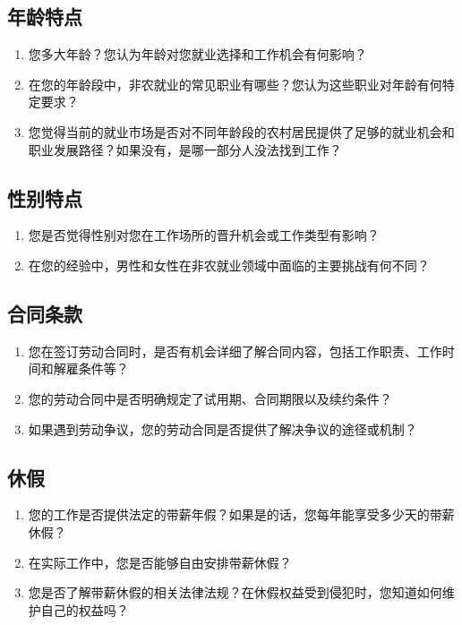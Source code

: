 \documentclass[12pt]{article}
\begin{document}
\subsection*{年龄特点}
\begin{enumerate}
    \item 您多大年龄？您认为年龄对您就业选择和工作机会有何影响？
    \item 在您的年龄段中，非农就业的常见职业有哪些？您认为这些职业对年龄有何特定要求？
    \item 您觉得当前的就业市场是否对不同年龄段的农村居民提供了足够的就业机会和职业发展路径？如果没有，是哪一部分人没法找到工作？
\end{enumerate}

\subsection*{性别特点}
\begin{enumerate}
    \item 您是否觉得性别对您在工作场所的晋升机会或工作类型有影响？
    \item 在您的经验中，男性和女性在非农就业领域中面临的主要挑战有何不同？
\end{enumerate}

\subsection*{合同条款}
\begin{enumerate}
    \item 您在签订劳动合同时，是否有机会详细了解合同内容，包括工作职责、工作时间和解雇条件等？
    \item 您的劳动合同中是否明确规定了试用期、合同期限以及续约条件？
    \item 如果遇到劳动争议，您的劳动合同是否提供了解决争议的途径或机制？
\end{enumerate}

\subsection*{休假}
\begin{enumerate}
    \item 您的工作是否提供法定的带薪年假？如果是的话，您每年能享受多少天的带薪休假？
    \item 在实际工作中，您是否能够自由安排带薪休假？
    \item 您是否了解带薪休假的相关法律法规？在休假权益受到侵犯时，您知道如何维护自己的权益吗？
\end{enumerate}
\end{document}
